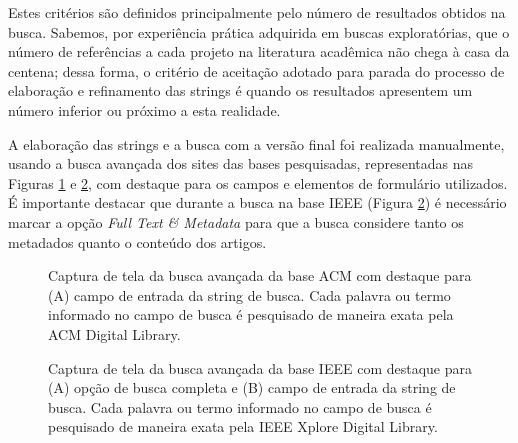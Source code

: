 Estes critérios são definidos principalmente pelo
número de resultados obtidos na busca.
Sabemos, por experiência prática adquirida em buscas exploratórias, 
que o número de referências a cada projeto na
literatura acadêmica não chega à casa da centena; dessa forma, o critério de
aceitação adotado para parada do processo de elaboração e refinamento das strings é
quando os resultados apresentem um número inferior ou próximo a esta realidade.

A elaboração das strings e a busca com a versão final foi
realizada manualmente, usando a busca avançada dos sites das bases pesquisadas,
representadas nas Figuras \ref{advanced-search-acm} e
\ref{advanced-search-ieee}, com destaque para os campos e elementos de formulário
utilizados. É importante destacar que durante a busca na
base IEEE (Figura \ref{advanced-search-ieee}) é necessário marcar a opção {\it Full Text \& Metadata} para que a
busca considere tanto os metadados quanto o conteúdo dos artigos.

\begin{figure}[h]
  \center
  \caption{Captura de tela da busca avançada da base ACM com destaque para (A) campo de entrada da string de busca.
           Cada palavra ou termo informado no campo de busca é pesquisado de maneira exata pela ACM Digital Library.}
  \label{advanced-search-acm}
\end{figure}

\begin{figure}[h]
  \center
  \caption{Captura de tela da busca avançada da base IEEE com destaque para (A) opção de busca completa e (B) campo de entrada da string de busca.
           Cada palavra ou termo informado no campo de busca é pesquisado de maneira exata pela IEEE Xplore Digital Library.}
  \label{advanced-search-ieee}
\end{figure}


